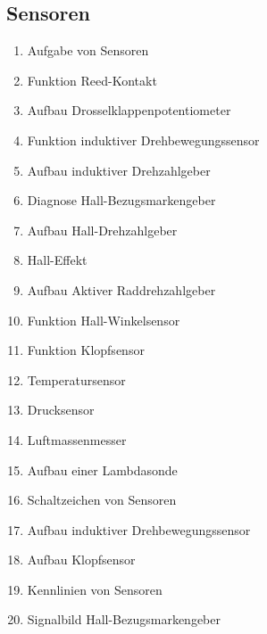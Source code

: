 \subsection{Sensoren}\label{sensoren}

\begin{enumerate}
\item
  Aufgabe von Sensoren\\
\item
  Funktion Reed-Kontakt\\
\item
  Aufbau Drosselklappenpotentiometer\\
\item
  Funktion induktiver Drehbewegungssensor\\
\item
  Aufbau induktiver Drehzahlgeber\\
\item
  Diagnose Hall-Bezugsmarkengeber\\
\item
  Aufbau Hall-Drehzahlgeber\\
\item
  Hall-Effekt\\
\item
  Aufbau Aktiver Raddrehzahlgeber\\
\item
  Funktion Hall-Winkelsensor\\
\item
  Funktion Klopfsensor\\
\item
  Temperatursensor\\
\item
  Drucksensor\\
\item
  Luftmassenmesser\\
\item
  Aufbau einer Lambdasonde\\
\item
  Schaltzeichen von Sensoren\\
\item
  Aufbau induktiver Drehbewegungssensor\\
\item
  Aufbau Klopfsensor\\
\item
  Kennlinien von Sensoren\\
\item
  Signalbild Hall-Bezugsmarkengeber\\

\end{enumerate}
